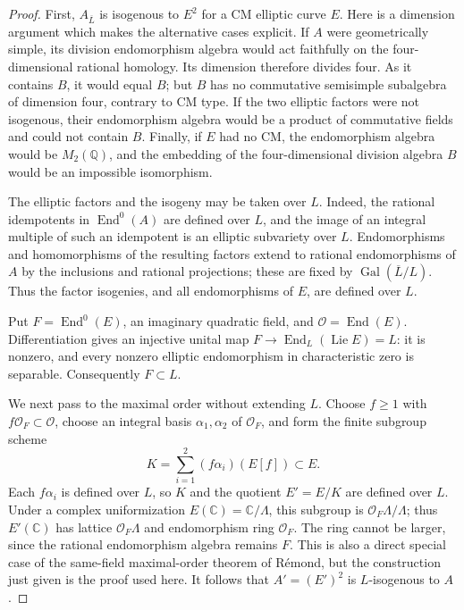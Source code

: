 \documentclass[11pt]{article}
\theoremstyle{definition}
\theoremstyle{remark}
\begin{document}
\begin{proof}
First, $A_{\overline L}$ is isogenous to $E^2$ for a CM elliptic curve
$E$. Here is a dimension argument which makes the alternative cases
explicit. If $A$ were geometrically simple, its division endomorphism
algebra would act faithfully on the four-dimensional rational homology.
Its dimension therefore divides four. As it contains $B$, it would equal
$B$; but $B$ has no commutative semisimple subalgebra of dimension four,
contrary to CM type. If the two elliptic factors were not isogenous,
their endomorphism algebra would be a product of commutative fields and
could not contain $B$. Finally, if $E$ had no CM, the endomorphism algebra
would be $M_2(\mathbb Q)$, and the embedding of the four-dimensional
division algebra $B$ would be an impossible isomorphism.

The elliptic factors and the isogeny may be taken over $L$. Indeed,
the rational idempotents in $\operatorname{End}^0(A)$ are defined over
$L$, and the image of an integral multiple of such an idempotent is an
elliptic subvariety over $L$. Endomorphisms and homomorphisms of the
resulting factors extend to rational endomorphisms of $A$ by the
inclusions and rational projections; these are fixed by
$\operatorname{Gal}(\overline L/L)$. Thus the factor isogenies, and all
endomorphisms of $E$, are defined over $L$.

Put $F=\operatorname{End}^0(E)$, an imaginary quadratic field, and
$\mathcal O=\operatorname{End}(E)$. Differentiation gives an injective
unital map $F\longrightarrow\operatorname{End}_L(\operatorname{Lie}E)=L$:
it is nonzero, and every nonzero elliptic endomorphism in characteristic
zero is separable. Consequently $F\subset L$.

We next pass to the maximal order without extending $L$. Choose
$f\ge1$ with $f\mathcal O_F\subset\mathcal O$, choose an integral
basis $\alpha_1,\alpha_2$ of $\mathcal O_F$, and form the finite
subgroup scheme
\[
 K=\sum_{i=1}^2(f\alpha_i)(E[f])\subset E.
\]
Each $f\alpha_i$ is defined over $L$, so $K$ and the quotient
$E'=E/K$ are defined over $L$. Under a complex uniformization
$E(\mathbb C)=\mathbb C/\Lambda$, this subgroup is
$\mathcal O_F\Lambda/\Lambda$; thus $E'(\mathbb C)$ has lattice
$\mathcal O_F\Lambda$ and endomorphism ring $\mathcal O_F$.
The ring cannot be larger, since the rational endomorphism algebra
remains $F$. This is also a direct special case of the same-field
maximal-order theorem of R\'emond, but the construction just given is
the proof used here. It follows that $A'=(E')^2$ is $L$-isogenous to $A$.


\end{proof}
\end{document}
